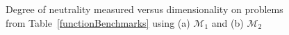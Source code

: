 \documentclass[conference]{IEEEtran}
\begin{document}
\begin{figure}[!ht]
	\centering
	\label{figNeutralityVsDimensionsM1}	
		
	\label{figNeutralityVsDimensionsM2}	
	\caption{Degree of neutrality measured versus dimensionality on problems from Table~\ref{functionBenchmarks} using (a) ${\mathcal{M}_1}$ and (b) ${\mathcal{M}_2}$ }
	\label{figNeutralityVsDimensions}
\end{figure}

\end{document}
